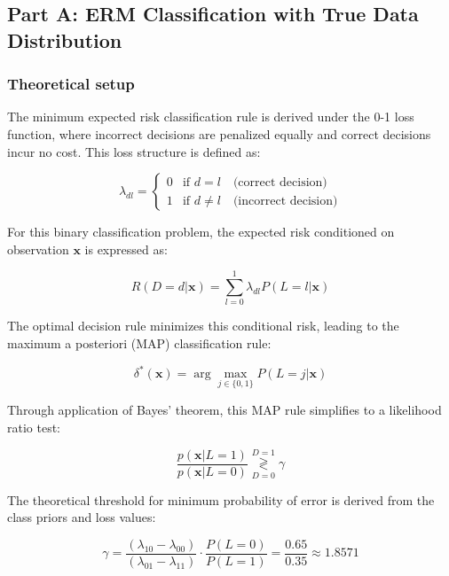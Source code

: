 \documentclass[12pt]{article}
\begin{document}
\subsection{Part A: ERM Classification with True Data Distribution}

\subsubsection{Theoretical setup}

The minimum expected risk classification rule is derived under the 0-1 loss function, where incorrect decisions are penalized equally and correct decisions incur no cost. This loss structure is defined as:

\begin{equation}
\lambda_{dl} = \begin{cases} 
0 & \text{if } d = l \quad \text{(correct decision)} \\
1 & \text{if } d \neq l \quad \text{(incorrect decision)}
\end{cases}
\end{equation}

For this binary classification problem, the expected risk conditioned on observation $\mathbf{x}$ is expressed as:

\begin{equation}
R(D=d|\mathbf{x}) = \sum_{l=0}^{1} \lambda_{dl} P(L=l|\mathbf{x})
\end{equation}

The optimal decision rule minimizes this conditional risk, leading to the maximum a posteriori (MAP) classification rule:

\begin{equation}
\delta^*(\mathbf{x}) = \arg\max_{j \in \{0,1\}} P(L=j|\mathbf{x})
\end{equation}

Through application of Bayes' theorem, this MAP rule simplifies to a likelihood ratio test:

\begin{equation}
\frac{p(\mathbf{x}|L=1)}{p(\mathbf{x}|L=0)} \stackrel{D=1}{\underset{D=0}{\gtrless}} \gamma
\end{equation}

The theoretical threshold for minimum probability of error is derived from the class priors and loss values:

\begin{equation}
\gamma = \frac{(\lambda_{10} - \lambda_{00})}{(\lambda_{01} - \lambda_{11})} \cdot \frac{P(L=0)}{P(L=1)} = \frac{0.65}{0.35} \approx 1.8571
\end{equation}
\end{document}
